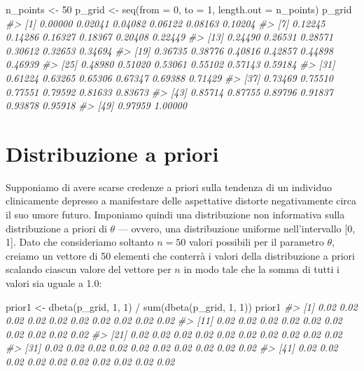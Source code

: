 \documentclass[
  11pt,
]{krantz}
\makeatletter
\newenvironment{Shaded}{\begin{snugshade}}{\end{snugshade}}
\newcommand{\AttributeTok}[1]{\textcolor[rgb]{0.61,0.61,0.61}{#1}}
\newcommand{\CommentTok}[1]{\textcolor[rgb]{0.37,0.37,0.37}{\textit{#1}}}
\newcommand{\DecValTok}[1]{\textcolor[rgb]{0.06,0.06,0.06}{#1}}
\newcommand{\FunctionTok}[1]{\textcolor[rgb]{0,0,0}{#1}}
\newcommand{\NormalTok}[1]{#1}
\newcommand{\OtherTok}[1]{\textcolor[rgb]{0.37,0.37,0.37}{#1}}
\newcommand{\SpecialCharTok}[1]{\textcolor[rgb]{0,0,0}{#1}}
\newenvironment{kframe}{%
\medskip{}
\setlength{\fboxsep}{.8em}
 \def\at@end@of@kframe{}%
 \ifinner\ifhmode%
  \def\at@end@of@kframe{\end{minipage}}%
  \begin{minipage}{\columnwidth}%
 \fi\fi%
 \def\FrameCommand##1{\hskip\@totalleftmargin \hskip-\fboxsep
 \colorbox{shadecolor}{##1}\hskip-\fboxsep
     \hskip-\linewidth \hskip-\@totalleftmargin \hskip\columnwidth}%
 \MakeFramed {\advance\hsize-\width
   \@totalleftmargin\z@ \linewidth\hsize
   \@setminipage}}%
 {\par\unskip\endMakeFramed%
 \at@end@of@kframe}
\renewenvironment{Shaded}{\begin{kframe}}{\end{kframe}}
\theoremstyle{definition}
\theoremstyle{definition}
\theoremstyle{definition}
\theoremstyle{definition}
\theoremstyle{remark}
\makeatother
\begin{document}
\begin{Shaded}
\begin{Highlighting}[]
\NormalTok{n\_points }\OtherTok{\textless{}{-}} \DecValTok{50}
\NormalTok{p\_grid }\OtherTok{\textless{}{-}} \FunctionTok{seq}\NormalTok{(}\AttributeTok{from =} \DecValTok{0}\NormalTok{, }\AttributeTok{to =} \DecValTok{1}\NormalTok{, }\AttributeTok{length.out =}\NormalTok{ n\_points)}
\NormalTok{p\_grid}
\CommentTok{\#\textgreater{}  [1] 0.00000 0.02041 0.04082 0.06122 0.08163 0.10204}
\CommentTok{\#\textgreater{}  [7] 0.12245 0.14286 0.16327 0.18367 0.20408 0.22449}
\CommentTok{\#\textgreater{} [13] 0.24490 0.26531 0.28571 0.30612 0.32653 0.34694}
\CommentTok{\#\textgreater{} [19] 0.36735 0.38776 0.40816 0.42857 0.44898 0.46939}
\CommentTok{\#\textgreater{} [25] 0.48980 0.51020 0.53061 0.55102 0.57143 0.59184}
\CommentTok{\#\textgreater{} [31] 0.61224 0.63265 0.65306 0.67347 0.69388 0.71429}
\CommentTok{\#\textgreater{} [37] 0.73469 0.75510 0.77551 0.79592 0.81633 0.83673}
\CommentTok{\#\textgreater{} [43] 0.85714 0.87755 0.89796 0.91837 0.93878 0.95918}
\CommentTok{\#\textgreater{} [49] 0.97959 1.00000}
\end{Highlighting}
\end{Shaded}

\hypertarget{distribuzione-a-priori}{%
\section{Distribuzione a priori}\label{distribuzione-a-priori}}

Supponiamo di avere scarse credenze a priori sulla tendenza di un individuo clinicamente depresso a manifestare delle aspettative distorte negativamente circa il suo umore futuro. Imponiamo quindi una distribuzione non informativa sulla distribuzione a priori di \(\theta\) --- ovvero, una distribuzione uniforme nell'intervallo {[}0, 1{]}. Dato che consideriamo soltanto \(n = 50\) valori possibili per il parametro \(\theta\), creiamo un vettore di 50 elementi che conterrà i valori della distribuzione a priori scalando ciascun valore del vettore per \(n\) in modo tale che la somma di tutti i valori sia uguale a 1.0:

\begin{Shaded}
\begin{Highlighting}[]
\NormalTok{prior1 }\OtherTok{\textless{}{-}} \FunctionTok{dbeta}\NormalTok{(p\_grid, }\DecValTok{1}\NormalTok{, }\DecValTok{1}\NormalTok{) }\SpecialCharTok{/} \FunctionTok{sum}\NormalTok{(}\FunctionTok{dbeta}\NormalTok{(p\_grid, }\DecValTok{1}\NormalTok{, }\DecValTok{1}\NormalTok{))}
\NormalTok{prior1}
\CommentTok{\#\textgreater{}  [1] 0.02 0.02 0.02 0.02 0.02 0.02 0.02 0.02 0.02 0.02}
\CommentTok{\#\textgreater{} [11] 0.02 0.02 0.02 0.02 0.02 0.02 0.02 0.02 0.02 0.02}
\CommentTok{\#\textgreater{} [21] 0.02 0.02 0.02 0.02 0.02 0.02 0.02 0.02 0.02 0.02}
\CommentTok{\#\textgreater{} [31] 0.02 0.02 0.02 0.02 0.02 0.02 0.02 0.02 0.02 0.02}
\CommentTok{\#\textgreater{} [41] 0.02 0.02 0.02 0.02 0.02 0.02 0.02 0.02 0.02 0.02}
\end{Highlighting}
\end{Shaded}
\end{document}
